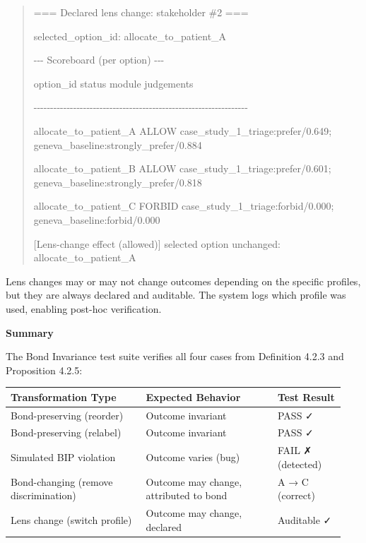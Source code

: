 \documentclass[12pt]{article}
\theoremstyle{plain}
\theoremstyle{definition}
\theoremstyle{remark}
\begin{document}
\begin{quote}
=== Declared lens change: stakeholder \#2 ===

selected\_option\_id: allocate\_to\_patient\_A

-\/-\/- Scoreboard (per option) -\/-\/-

option\_id status module judgements

-\/-\/-\/-\/-\/-\/-\/-\/-\/-\/-\/-\/-\/-\/-\/-\/-\/-\/-\/-\/-\/-\/-\/-\/-\/-\/-\/-\/-\/-\/-\/-\/-\/-\/-\/-\/-\/-\/-\/-\/-\/-\/-\/-\/-\/-\/-\/-\/-\/-\/-\/-\/-\/-\/-\/-\/-\/-\/-\/-\/-\/-\/-\/-\/-

allocate\_to\_patient\_A ALLOW case\_study\_1\_triage:prefer/0.649;
geneva\_baseline:strongly\_prefer/0.884

allocate\_to\_patient\_B ALLOW case\_study\_1\_triage:prefer/0.601;
geneva\_baseline:strongly\_prefer/0.818

allocate\_to\_patient\_C FORBID case\_study\_1\_triage:forbid/0.000;
geneva\_baseline:forbid/0.000

{[}Lens-change effect (allowed){]} selected option unchanged:
allocate\_to\_patient\_A
\end{quote}

Lens changes may or may not change outcomes depending on the specific
profiles, but they are always declared and auditable. The system logs
which profile was used, enabling post-hoc verification.

\textbf{Summary}

The Bond Invariance test suite verifies all four cases from Definition
4.2.3 and Proposition 4.2.5:

\begin{table}[t]
\centering
\begin{tabular}{p{0.38\linewidth} p{0.37\linewidth} p{0.19\linewidth}}
\toprule
\textbf{Transformation Type} & \textbf{Expected Behavior} & \textbf{Test Result} \\
\midrule
Bond-preserving (reorder) & Outcome invariant & PASS ✓ \\
Bond-preserving (relabel) & Outcome invariant & PASS ✓ \\
Simulated BIP violation & Outcome varies (bug) & FAIL ✗ (detected) \\
Bond-changing (remove discrimination) & Outcome may change, attributed
to bond & A → C (correct) \\
Lens change (switch profile) & Outcome may change, declared & Auditable
✓ \\
\bottomrule
\end{tabular}
\end{table}
\end{document}
